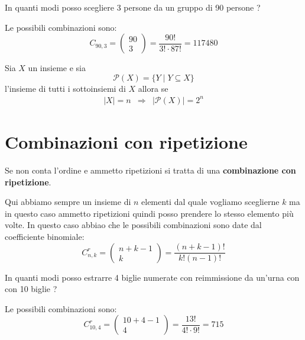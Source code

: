 \begin{example}
	In quanti modi posso scegliere 3 persone da un gruppo di 90 persone ?

	Le possibili combinazioni sono:
	\begin{equation*}
		C_{90, 3} =
		\begin{pmatrix}
			90 \\ 3
		\end{pmatrix} =
		\frac{90!}{3! \cdot 87!} = 117480
	\end{equation*}
\end{example}

\begin{theorem}
	Sia $X$ un insieme e sia
	\begin{equation*}
		\mathcal{P}(X) = \{ Y \mid Y \subseteq X \}
	\end{equation*}
	l'insieme di tutti i sottoinsiemi di $X$ allora se
	\begin{equation*}
		\begin{array}{ccc}
			|X| = n & \Rightarrow & |\mathcal{P}(X)| = 2^n
		\end{array}
	\end{equation*}
\end{theorem}

\section{Combinazioni con ripetizione}
\begin{defn}
	Se non conta l'ordine e ammetto ripetizioni si tratta di una
	\textbf{combinazione con ripetizione}.
\end{defn}

Qui abbiamo sempre un insieme di $n$ elementi dal quale vogliamo sceglierne $k$ ma in questo caso
ammetto ripetizioni quindi posso prendere lo stesso elemento pi\`u volte.
In questo caso abbiao che le possibili combinazioni sono date dal coefficiente binomiale:
\begin{equation*}
	C_{n, k}^r =
	\begin{pmatrix}
		n + k - 1 \\ k
	\end{pmatrix} =
	\frac{(n + k - 1)!}{k! (n - 1)!}
\end{equation*}

\begin{example}
	In quanti modi posso estrarre 4 biglie numerate con reimmissione da un'urna con con
	10 biglie ?

	Le possibili combinazioni sono:
	\begin{equation*}
		C_{10, 4}^r =
		\begin{pmatrix}
			10 + 4 - 1 \\ 4
		\end{pmatrix} =
		\frac{13!}{4! \cdot 9!} = 715
	\end{equation*}
\end{example}

